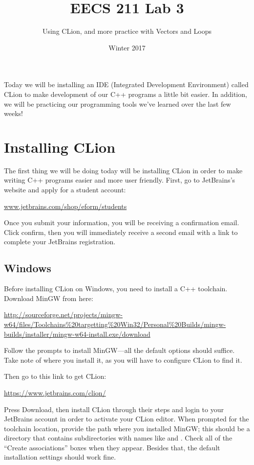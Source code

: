 \documentclass{tufte-handout}
\title{EECS 211 Lab 3}
\author{Using CLion, and more practice with Vectors and Loops}
\date{Winter 2017}
\begin{document}
\maketitle

Today we will be installing an IDE (Integrated Development Environment) called CLion to make development of our C++ programs a little bit easier.  In addition, we will be practicing our programming tools we've learned over the last few weeks!

\section{Installing CLion}

The first thing we will be doing today will be installing CLion in order
to make writing C++ programs easier and more user friendly.  First, go
to JetBrains's website and apply for a student account:
\medskip

\url{www.jetbrains.com/shop/eform/students} \medskip

\noindent
Once you submit your information, you will be receiving a confirmation
email.  Click confirm, then you will immediately receive a second email
with a link to complete your JetBrains registration.

\subsection{Windows}

Before installing CLion on Windows, you need to install a C++
toolchain. Download MinGW from here:

\medskip
\url{http://sourceforge.net/projects/mingw-w64/files/Toolchains%20targetting%20Win32/Personal%20Builds/mingw-builds/installer/mingw-w64-install.exe/download}

\medskip\noindent
Follow the prompts to install MinGW---all the default options should
suffice. Take note of where you install it, as you will have to
configure CLion to find it.

Then go to this link to get CLion:

\medskip
\url{https://www.jetbrains.com/clion/}

\medskip\noindent
Press Download, then install CLion through their steps
and login to your JetBrains account in order to activate your CLion
editor. When prompted for the toolchain location, provide the path where
you installed MinGW; this should be a directory that contains
subdirectories with names like  and . Check
all of the ``Create associations'' boxes when they appear. Besides that,
the default installation settings should work fine.
\end{document}

